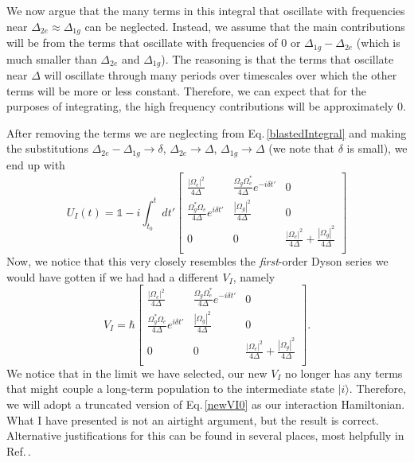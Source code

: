 We now argue that the many terms in this integral that oscillate with frequencies near $\Delta_{2e}\approx\Delta_{1g}$ can be neglected. Instead, we assume that the main contributions will be from the terms that oscillate with frequencies of $0$ or $\Delta_{1g}-\Delta_{2e}$ (which is much smaller than $\Delta_{2e}$ and $\Delta_{1g}$). The reasoning is that the terms that oscillate near $\Delta$ will oscillate through many periods over timescales over which the other terms will be more or less constant. Therefore, we can expect that for the purposes of integrating, the high frequency contributions will be approximately 0.

After removing the terms we are neglecting from Eq.\,\eqref{blastedIntegral} and making the substitutions $\Delta_{2e}-\Delta_{1g}\rightarrow\delta$, $\Delta_{2e}\rightarrow\Delta$, $\Delta_{1g}\rightarrow\Delta$ (we note that $\delta$ is small), we end up with 
\begin{equation}
U_I(t)=\mathds{1} -i \int_{t_0}^{t} dt'
\begin{bmatrix}
\frac{|\Omega_e|^2}{4\Delta} & \frac{\Omega_g\Omega_e^*}{4\Delta}e^{-i\delta t'} & 0 \\
\frac{\Omega_g^*\Omega_e}{4\Delta}e^{i\delta t'} & \frac{|\Omega_g|^2}{4\Delta} & 0 \\
0 & 0 & \frac{|\Omega_e|^2}{4\Delta} + \frac{|\Omega_g|^2}{4\Delta} \\
\end{bmatrix}
\end{equation}
Now, we notice that this very closely resembles the \emph{first}-order Dyson series we would have gotten if we had had a different $V_I$, namely 
\begin{equation}
V_I=
\hbar\begin{bmatrix}\frac{|\Omega_e|^2}{4\Delta} & \frac{\Omega_g\Omega_e^*}{4\Delta}e^{-i\delta t'} & 0 \\
\frac{\Omega_g^*\Omega_e}{4\Delta}e^{i\delta t'} & \frac{|\Omega_g|^2}{4\Delta} & 0 \\
0 & 0 & \frac{|\Omega_e|^2}{4\Delta} + \frac{|\Omega_g|^2}{4\Delta} \\
\end{bmatrix}.\label{newVI0}
\end{equation}
We notice that in the limit we have selected, our new $V_I$ no longer has any terms that might couple a long-term population to the intermediate state $|i\rangle$. Therefore, we will adopt a truncated version of Eq.\,\eqref{newVI0} as our interaction Hamiltonian. What I have presented is not an airtight argument, but the result is correct. Alternative justifications for this can be found in several places, most helpfully in Ref.\,\cite{brionLambdaAdiabatic}.


